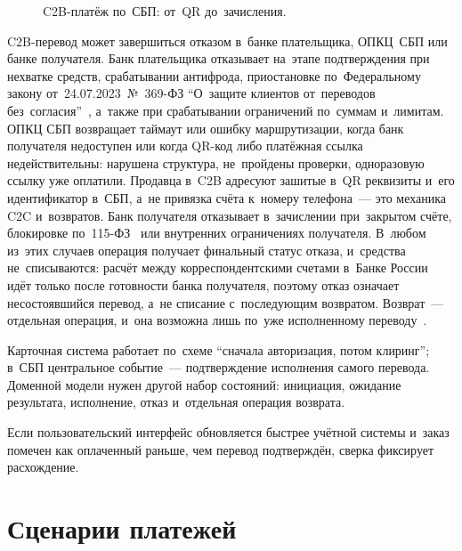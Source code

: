 \begin{figure}[tbp]
  \centering
  \caption{C2B-платёж по~СБП: от~QR
  до~зачисления.}\label{fig:sbp-c2b-flow}
\end{figure}

C2B-перевод может завершиться отказом в~банке плательщика,
ОПКЦ~СБП или банке получателя. Банк плательщика отказывает на~этапе
подтверждения при нехватке средств, срабатывании антифрода, приостановке
по~Федеральному закону от~24.07.2023~№~369-ФЗ \enquote{О~защите клиентов
от~переводов без~согласия}~\cite{fz-369-2023}, а~также при
срабатывании ограничений по~суммам и~лимитам. ОПКЦ СБП
возвращает таймаут или ошибку маршрутизации, когда банк получателя недоступен
или когда QR-код либо платёжная ссылка недействительны: нарушена структура,
не~пройдены проверки, одноразовую ссылку уже оплатили. Продавца в~C2B адресуют
зашитые в~QR реквизиты и~его идентификатор в~СБП, а~не привязка счёта к~номеру
телефона~--- это механика C2C и~возвратов. Банк получателя отказывает
в~зачислении при~закрытом счёте, блокировке по~115-ФЗ~\cite{fz-115} или
внутренних ограничениях получателя.
В~любом из~этих случаев операция получает финальный статус отказа, и~средства
не~списываются: расчёт между корреспондентскими счетами в~Банке России идёт
только после готовности банка получателя, поэтому отказ означает несостоявшийся
перевод, а~не списание с~последующим возвратом. Возврат~--- отдельная операция,
и~она возможна лишь по~уже исполненному
переводу~\cite{cbr-sbp-actions,sbp-faq-business}.

Карточная система работает по~схеме \enquote{сначала авторизация, потом
клиринг}; в~СБП центральное событие~--- подтверждение исполнения самого
перевода. Доменной модели нужен другой набор состояний: инициация, ожидание
результата, исполнение, отказ и~отдельная операция возврата.


Если пользовательский интерфейс обновляется быстрее учётной системы и~заказ
помечен как оплаченный раньше, чем перевод подтверждён, сверка фиксирует
расхождение.

\section{Сценарии платежей}\label{sec:sbp-scenarios}

